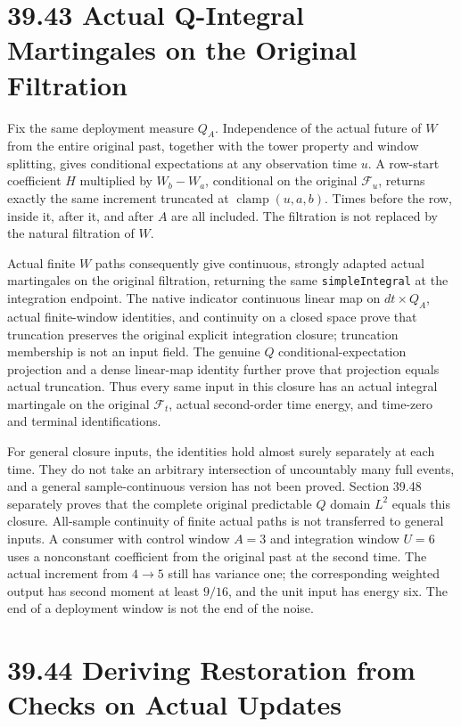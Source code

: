 \documentclass[
  english,
  11pt,
  oneside]{book}
\begin{document}
\section{39.43 Actual Q-Integral Martingales on the Original Filtration}\label{actual-q-integral-martingales-on-the-original-filtration}

Fix the same deployment measure \(Q_A\). Independence of the actual future of \(W\) from the entire original past, together with the tower property and window splitting, gives conditional expectations at any observation time \(u\). A row-start coefficient \(H\) multiplied by \(W_b-W_a\), conditional on the original \(\mathcal F_u\), returns exactly the same increment truncated at \(\operatorname{clamp}(u,a,b)\). Times before the row, inside it, after it, and after \(A\) are all included. The filtration is not replaced by the natural filtration of \(W\).

Actual finite \(W\) paths consequently give continuous, strongly adapted actual martingales on the original filtration, returning the same \nolinkurl{simpleIntegral} at the integration endpoint. The native indicator continuous linear map on \(dt\times Q_A\), actual finite-window identities, and continuity on a closed space prove that truncation preserves the original explicit integration closure; truncation membership is not an input field. The genuine \(Q\) conditional-expectation projection and a dense linear-map identity further prove that projection equals actual truncation. Thus every same input in this closure has an actual integral martingale on the original \(\mathcal F_t\), actual second-order time energy, and time-zero and terminal identifications.

For general closure inputs, the identities hold almost surely separately at each time. They do not take an arbitrary intersection of uncountably many full events, and a general sample-continuous version has not been proved. Section 39.48 separately proves that the complete original predictable \(Q\) domain \(L^2\) equals this closure. All-sample continuity of finite actual paths is not transferred to general inputs. A consumer with control window \(A=3\) and integration window \(U=6\) uses a nonconstant coefficient from the original past at the second time. The actual increment from \(4\to5\) still has variance one; the corresponding weighted output has second moment at least \(9/16\), and the unit input has energy six. The end of a deployment window is not the end of the noise.

\section{39.44 Deriving Restoration from Checks on Actual Updates}\label{deriving-restoration-from-checks-on-actual-updates}
\end{document}
